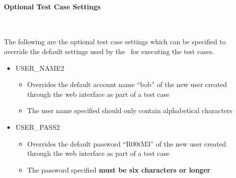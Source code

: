 \paragraph*{Optional Test Case Settings}~\newline

The following are the optional test case settings which can be specified to override
the default settings used by the \cernvmtestframework\ for executing the \cernvmreleasetesting
test cases.

\begin{itemize}
\item	USER\_NAME2
		\begin{itemize}
		\item	Overrides the default account name ``bob'' of the new user created 
				through the web interface as part of a \cernvmreleasetesting test case
		\item	The user name specified should only contain alphabetical characters
		\end{itemize}
		
\item	USER\_PASS2
		\begin{itemize}
		\item	Overrides the default password ``R00tM3'' of the new user created 
				through the web interface as part of a \cernvmreleasetesting test case
		\item	The password specified {\bf must be six characters or longer}
		\end{itemize}
\end{itemize}